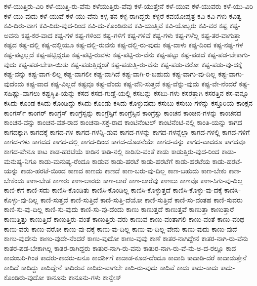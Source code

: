 {ಕಳೆ-ಯುತ್ತಿರು-ವಿರಿ
ಕಳೆ-ಯುತ್ತಿ-ರು-ವೆನು
ಕಳೆಯುತ್ತಿರು-ವೆವು
ಕಳೆ-ಯುತ್ತೇನೆ
ಕಳೆ-ಯುವ
ಕಳೆ-ಯುವರು
ಕಳೆ-ಯು-ವಿರಿ
ಕಳೆ-ಯು-ವುದು
ಕಳೆ-ಯುವೆ
ಕಳೆ-ಯು-ವೆನು
ಕಳ್ಳ-ತನ
ಕಳ್ಳ-ರಾಗಿದ್ದರು
ಕಳ್ಳರೆ
ಕವಯೋಪ್ಯತ್ರ
ಕವಿ
ಕವಿ-ಗಳು
ಕವಿತ್ವ
ಕವಿ-ದಿರು-ವಾಗ
ಕವಿ-ದಿರು-ವುದ-ರಿಂದ
ಕವಿ-ದು-ಕೊಂಡಿರುವ
ಕವಿ-ಯುತ್ತಿವೆ
ಕವಿ-ಯೊಬ್ಬರು
ಕವಿ-ವರ
ಕಷ್ಟ
ಕಷ್ಟ-ಅವನು
ಕಷ್ಟ-ಕರ-ವಾದ
ಕಷ್ಟ-ಗಳ
ಕಷ್ಟ-ಗಳಿಂದ
ಕಷ್ಟ-ಗಳಿಗೆ
ಕಷ್ಟ-ಗಳಿವೆ
ಕಷ್ಟ-ಗಳು
ಕಷ್ಟ-ಗಳೆಲ್ಲ
ಕಷ್ಟ-ತರ-ವಾಗುತ್ತಾ
ಕಷ್ಟದ
ಕಷ್ಟ-ದಲ್ಲಿ
ಕಷ್ಟ-ದಲ್ಲಿಯೂ
ಕಷ್ಟ-ದಲ್ಲಿ-ರುವನು
ಕಷ್ಟ-ದಲ್ಲಿ-ರು-ವುದು
ಕಷ್ಟ-ದಾಳು
ಕಷ್ಟ-ದಿಂದ
ಕಷ್ಟ-ನಷ್ಟ-ಗಳ
ಕಷ್ಟ-ಪಟ್ಟಲ್ಲದೆ
ಕಷ್ಟ-ಪಟ್ಟಿದ್ದರೂ
ಕಷ್ಟ-ಪಟ್ಟಿ-ರುವಳು
ಕಷ್ಟ-ಪಟ್ಟಿ-ರು-ವೆನು
ಕಷ್ಟ-ಪಟ್ಟು
ಕಷ್ಟ-ಪಡದೆ
ಕಷ್ಟ-ಪಡ-ಬೇಕಾಗು-ವುದು
ಕಷ್ಟ-ಪಡ-ಬೇಕಾ-ಯಿತು
ಕಷ್ಟ-ಪಡುತ್ತಿದ್ದಂತೆ
ಕಷ್ಟ-ಪಡುತ್ತಿ-ರು-ವೆನು
ಕಷ್ಟ-ಪಡು-ವರೋ
ಕಷ್ಟ-ಪಡು-ವು-ದಕ್ಕೆ
ಕಷ್ಟ-ವನ್ನು
ಕಷ್ಟ-ವಾಗ-ಲಿಲ್ಲ
ಕಷ್ಟ-ವಾಗಲೀ
ಕಷ್ಟ-ವಾಗಿದೆ
ಕಷ್ಟ-ವಾಗಿ-ರ-ಬಹುದು
ಕಷ್ಟ-ವಾಗು-ವು-ದಿಲ್ಲ
ಕಷ್ಟ-ವಾಗು-ವುದೆಂದು
ಕಷ್ಟ-ವಾದ
ಕಷ್ಟ-ವಿಲ್ಲದೆ
ಕಷ್ಟವೂ
ಕಷ್ಟ-ವೆಂದು
ಕಷ್ಟ-ವೆನಿ-ಸುತ್ತದೆ
ಕಷ್ಟ-ವೆನ್ನು-ವುದು
ಕಷ್ಟ-ವೇ-ನೆಂದರೆ
ಕಷ್ಟ-ಸಹಿಷ್ಣು-ವಾಗಲು
ಕಷ್ಟಸ್ಥಿತಿ-ಯನ್ನು
ಕಸದ
ಕಸದ-ಗುಡ್ಡೆ-ಯಲ್ಲಿ
ಕಸಬನ್ನು
ಕಸಬು-ಗಳು
ಕಸರತ್ತಾಗಿ
ಕಸರತ್ತಿನ
ಕಸ-ವನ್ನೂ
ಕಸಿದು-ಕೊಂಡ
ಕಸಿದು-ಕೊಂಡಿದ್ದು
ಕಸಿದು-ಕೊಂಡು
ಕಸಿದು-ಕೊಳ್ಳುವುದು
ಕಸುಬು
ಕಸುಬು-ಗಳನ್ನು
ಕಸ್ತೂರಿಯ
ಕಾಂಕ್ಷನ
ಕಾಂಗರ್ಸ್
ಕಾಂಗರ್‌
ಕಾಂಗ್ರೆಸ್
ಕಾಂಗ್ರೆಸ್ಸನ್ನು
ಕಾಂಗ್ರೆಸ್ಸಿಗೆ
ಕಾಂಗ್ರೆಸ್ಸಿನ
ಕಾಂಗ್ರೆಸ್ಸು
ಕಾಂಚನ
ಕಾಂಚನ-ಗಳನ್ನು
ಕಾಂಚನದ
ಕಾಂಚನ-ವನ್ನು
ಕಾಂಚನ-ವಶ-ರಾದ
ಕಾಂಚನಾ-ಸಕ್ತ-ರಾದ
ಕಾಂಟಿನೆಂಟಲ್
ಕಾಂಟಿನೆಂಟಿ-ನಲ್ಲಿ
ಕಾಂತಿ-ಯನ್ನು
ಕಾಗದ
ಕಾಗದಕ್ಕಾಗಿ
ಕಾಗದಕ್ಕೆ
ಕಾಗದ-ಗಳ
ಕಾಗದ-ಗಳನ್ನಿ-ಡುವ
ಕಾಗದ-ಗಳನ್ನು
ಕಾಗದ-ಗಳನ್ನೆಲ್ಲಾ
ಕಾಗದ-ಗಳಲ್ಲಿ
ಕಾಗದ-ಗಳಿಗೆ
ಕಾಗದ-ಗಳು
ಕಾಗದದ
ಕಾಗದ-ದಲ್ಲಿ
ಕಾಗದ-ದಿಂದ
ಕಾಗದ-ದೊಡನೆಯೇ
ಕಾಗದ-ವನ್ನು
ಕಾಗದ-ವಾದರೂ
ಕಾಗದವೂ
ಕಾಗದ-ವೇನೂ
ಕಾಟ
ಕಾಡ-ಹರಟೆಯೆ
ಕಾಡಿನ
ಕಾಡಿ-ನಲ್ಲಿ
ಕಾಡಿಸು-ವಂತೆ
ಕಾಡು
ಕಾಡುತ್ತಿರು-ವುದ-ರಿಂದ
ಕಾಡು-ಮನುಷ್ಯ-ನಿಗೂ
ಕಾಡು-ಮನುಷ್ಯ-ರೆಂದೂ
ಕಾಡುವ
ಕಾಡು-ಹರಟೆ
ಕಾಡು-ಹರಟೆಗೆ
ಕಾಡು-ಹರಟೆಯ
ಕಾಡು-ಹರಟೆ-ಯನ್ನು
ಕಾಡು-ಹರಟೆ-ಯಿಂದ
ಕಾಣದ
ಕಾಣದು
ಕಾಣದೆ
ಕಾಣ-ಬರು-ವು-ದಿಲ್ಲ
ಕಾಣ-ಬಹುದು
ಕಾಣ-ಬೇಕು
ಕಾಣ-ಬೇಕೆಂದು
ಕಾಣ-ಬೇಡ
ಕಾಣರು
ಕಾಣ-ಲಾರರು
ಕಾಣ-ಲಾರೆ
ಕಾಣ-ಲಾರೆವು
ಕಾಣಲು
ಕಾಣವೊ
ಕಾಣ-ಸಿಗು-ವು-ದಿಲ್ಲ
ಕಾಣಿ-ಕೆಗೆ
ಕಾಣಿ-ಸದು
ಕಾಣಿಸಿ-ಕೊಂಡಿತು
ಕಾಣಿಸಿ-ಕೊಂಡಿಲ್ಲ
ಕಾಣಿಸಿ-ಕೊಳ್ಳುತ್ತದೆ
ಕಾಣಿಸಿ-ಕೊಳ್ಳು-ವು-ದಕ್ಕೆ
ಕಾಣಿಸಿ-ಕೊಳ್ಳು-ವು-ದಿಲ್ಲ
ಕಾಣಿ-ಸುತ್ತದೆ
ಕಾಣಿ-ಸುತ್ತಿದೆ
ಕಾಣಿ-ಸುತ್ತಿ-ದೆಯೋ
ಕಾಣಿ-ಸುತ್ತಿವೆ
ಕಾಣಿ-ಸು-ವಂತಹ
ಕಾಣಿ-ಸುವರು
ಕಾಣಿ-ಸು-ವು-ದಿಲ್ಲ
ಕಾಣಿ-ಸು-ವುದು
ಕಾಣಿ-ಸು-ವು-ದೆಂದು
ಕಾಣು
ಕಾಣುತ್ತದೆ
ಕಾಣುತ್ತವೆ
ಕಾಣುತ್ತಾ
ಕಾಣುತ್ತಾರೆ
ಕಾಣುತ್ತಿತ್ತು
ಕಾಣುತ್ತಿದೆ
ಕಾಣುತ್ತಿರು-ವಂತೆ
ಕಾಣುತ್ತಿರು-ವರು
ಕಾಣುವ
ಕಾಣು-ವಂತಾಗಲಿ
ಕಾಣು-ವಂತೆ
ಕಾಣು-ವಂಥ
ಕಾಣು-ವರು
ಕಾಣು-ವರೋ
ಕಾಣು-ವು-ದಕ್ಕೆ
ಕಾಣು-ವು-ದಿಲ್ಲ
ಕಾಣು-ವು-ದಿಲ್ಲ-ವೇನು
ಕಾಣು-ವುದು
ಕಾಣು-ವುದೆ
ಕಾಣು-ವುದೇನು
ಕಾಣು-ವುದೇ-ನೆಂದರೆ
ಕಾಣು-ವುದೋ
ಕಾಣು-ವುವು
ಕಾಣೆ
ಕಾತರ-ನಾಗಿದ್ದೇನೆ
ಕಾತರ-ನಾಗಿ-ರು-ವೆನು
ಕಾತರ-ಪಡ-ಬೇಕಾಗಿಲ್ಲ
ಕಾತರ-ರಾಗಿದ್ದರು
ಕಾತುರ-ನಾಗಿ-ರು-ವನು
ಕಾತುರ-ನಾಗಿ-ರು-ವೆ-ನು-ಅ-ದ-ರಲ್ಲೂ
ಕಾದ
ಕಾದಂಬರಿ-ಗಿಂತ
ಕಾದರು-ಕಾದರು-ಏನೂ
ಕಾದರ್ಶಿಗೆ
ಕಾದಾಡ-ಕೂಡ-ದೆಂದೂ
ಕಾದಾಡಿ
ಕಾದಾಡಿ-ದರೆ
ಕಾದಾಡುತ್ತೇನೆ
ಕಾದಿದೆ
ಕಾದಿದ್ದು
ಕಾದಿದ್ದೇನೆ
ಕಾದಿರುವ
ಕಾದಿರು-ವಾಗಲೇ
ಕಾದಿ-ರು-ವುದು
ಕಾದಿವೆ
ಕಾದು
ಕಾದು-ಕಾದು
ಕಾದು-ಕೊಂಡಿರು-ವುದೋ
ಕಾನೂನು
ಕಾನೂನು-ಗಳು
ಕಾನ್ವೇಸ್
}

